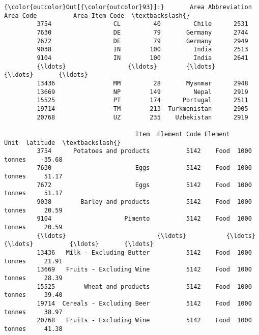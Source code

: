 \documentclass[11pt]{article}
\begin{document}
\begin{Verbatim}[commandchars=\\\{\}]
{\color{outcolor}Out[{\color{outcolor}93}]:}       Area Abbreviation  Area Code          Area Item Code  \textbackslash{}
         3754                 CL         40         Chile      2531   
         7630                 DE         79       Germany      2744   
         7672                 DE         79       Germany      2949   
         9038                 IN        100         India      2513   
         9104                 IN        100         India      2641   
         {\ldots}                 {\ldots}        {\ldots}           {\ldots}       {\ldots}   
         13436                MM         28       Myanmar      2948   
         13669                NP        149         Nepal      2919   
         15525                PT        174      Portugal      2511   
         19714                TM        213  Turkmenistan      2905   
         20768                UZ        235    Uzbekistan      2919   
         
                                    Item  Element Code Element         Unit  latitude  \textbackslash{}
         3754      Potatoes and products          5142    Food  1000 tonnes    -35.68   
         7630                       Eggs          5142    Food  1000 tonnes     51.17   
         7672                       Eggs          5142    Food  1000 tonnes     51.17   
         9038        Barley and products          5142    Food  1000 tonnes     20.59   
         9104                    Pimento          5142    Food  1000 tonnes     20.59   
         {\ldots}                         {\ldots}           {\ldots}     {\ldots}          {\ldots}       {\ldots}   
         13436   Milk - Excluding Butter          5142    Food  1000 tonnes     21.91   
         13669   Fruits - Excluding Wine          5142    Food  1000 tonnes     28.39   
         15525        Wheat and products          5142    Food  1000 tonnes     39.40   
         19714  Cereals - Excluding Beer          5142    Food  1000 tonnes     38.97   
         20768   Fruits - Excluding Wine          5142    Food  1000 tonnes     41.38   
         

\end{Verbatim}
\end{document}
